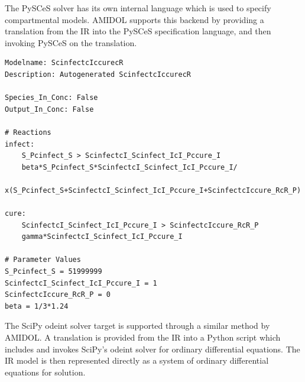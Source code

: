 \documentclass[11pt]{article}
\newcommand{\amidol}{\textsc{AMIDOL}}
\begin{document}
The PySCeS solver has its own internal language which is used to specify compartmental models.  \amidol{} supports this backend by providing a translation from the IR into the PySCeS specification language, and then invoking PySCeS on the translation.

\begin{verbatim}
Modelname: ScinfectcIccurecR
Description: Autogenerated ScinfectcIccurecR

Species_In_Conc: False
Output_In_Conc: False

# Reactions
infect:
	S_Pcinfect_S > ScinfectcI_Scinfect_IcI_Pccure_I
	beta*S_Pcinfect_S*ScinfectcI_Scinfect_IcI_Pccure_I/
           x(S_Pcinfect_S+ScinfectcI_Scinfect_IcI_Pccure_I+ScinfectcIccure_RcR_P)

cure:
	ScinfectcI_Scinfect_IcI_Pccure_I > ScinfectcIccure_RcR_P
	gamma*ScinfectcI_Scinfect_IcI_Pccure_I

# Parameter Values
S_Pcinfect_S = 51999999
ScinfectcI_Scinfect_IcI_Pccure_I = 1
ScinfectcIccure_RcR_P = 0
beta = 1/3*1.24
\end{verbatim}

The SciPy odeint solver target is supported through a similar method by \amidol{}.  A translation is provided from the IR into a Python script which includes and invokes SciPy's odeint solver for ordinary differential equations.  The IR model is then represented directly as a system of ordinary differential equations for solution.
\end{document}
